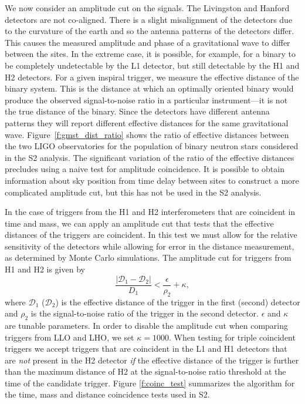 We now consider an amplitude cut on the signals. The Livingston and Hanford
detectors are not co-aligned. There is a slight misalignment of the detectors
due to the curvature of the earth and so the antenna patterns of the detectors
differ. This causes the measured amplitude and phase of a gravitational wave
to differ between the sites. In the extreme case, it is possible, for example,
for a binary to be completely undetectable by the L1 detector, but still
detectable by the H1 and H2 detectors. For a given inspiral trigger, we
measure the effective distance of the binary system. This is the distance at
which an optimally oriented binary would produce the observed signal-to-noise
ratio in a particular instrument---it is not the true distance of the binary.
Since the detectors have different antenna patterns they will report different
effective distances for the same gravitational wave.
Figure~\ref{f:gmst_dist_ratio} shows the ratio of effective distances between
the two LIGO observatories for the population of binary neutron stars
considered in the S2 analysis. The significant variation of the ratio of the
effective distances precludes using a naive test for amplitude coincidence. It
is possible to obtain information about sky position from time delay between
sites to construct a more complicated amplitude cut, but this has not be used
in the S2 analysis.

In the case of triggers from the H1 and H2 interferometers that are coincident
in time and mass, we can apply an amplitude cut that tests that the effective
distances of the triggers are coincident.  In this test we must allow for the
relative sensitivity of the detectors while allowing for error in the distance
measurement, as determined by Monte Carlo simulations. The amplitude cut for
triggers from H1 and H2 is given by 
\begin{equation}
\label{eq:eff_dist_test}
\frac{\left|\mathcal{D}_\mathrm{1} - \mathcal{D}_\mathrm{2}\right|}{D_\mathrm{1}}
< \frac{\epsilon}{\rho_\mathrm{2}} + \kappa,
\end{equation}
where $\mathcal{D}_1$ ($\mathcal{D}_2$) is the effective distance of the trigger in the first
(second) detector and $\rho_{2}$ is the signal-to-noise ratio of the trigger
in the second detector. $\epsilon$ and $\kappa$ are tunable parameters.
In order to disable the amplitude cut when comparing triggers from LLO and
LHO, we set $\kappa = 1000$.  When testing for triple coincident triggers we
accept triggers that are coincident in the L1 and H1 detectors that are
\emph{not} present in the H2 detector \emph{if} the effective distance of the
trigger is further than the maximum distance of H2 at the signal-to-noise
ratio threshold at the time of the candidate trigger.  Figure
\ref{f:coinc_test} summarizes the algorithm for the time, mass and distance
coincidence tests used in S2. 

